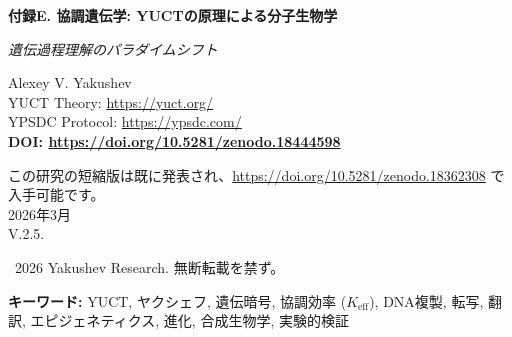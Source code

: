 \documentclass[12pt]{article}
\begin{document}
	
	\begin{titlepage}
		\begin{center}
			\vspace*{0cm}
			
			\Huge\textbf{付録E. 協調遺伝学: YUCTの原理による分子生物学}
			
			\vspace{1cm}
			
			\small\textit{遺伝過程理解のパラダイムシフト}
			
			\vspace{1cm}
			\Large
			Alexey V. Yakushev\\
			
			YUCT Theory: \url{https://yuct.org/}\\
			YPSDC Protocol: \url{https://ypsdc.com/}\\
			
			\vspace{2cm}
			\textbf{DOI: \url{https://doi.org/10.5281/zenodo.18444598}}
			
			\vspace{1cm}
			
			\vspace{0cm}
			\large 
			この研究の短縮版は既に発表され、\url{https://doi.org/10.5281/zenodo.18362308} で入手可能です。\\
			\vspace{1cm}
			2026年3月 \\ \large V.2.5.
			
			\vspace{4cm}
			\textcopyright~2026 Yakushev Research. 無断転載を禁ず。
			
			\newpage    
			\begin{abstract}
				\noindent
				本稿は、ヤクシェフの協調原理のレンズを通して遺伝過程の根本的な再考を提示する。遺伝暗号、DNA複製、遺伝子発現、進化が、測定可能な効率 $K_{\text{eff}}$ を持つ協調過程であることを示す。新しい数学モデルを導入し、従来説明できなかった現象を予測し、プログラム可能な進化への道を開く。理論は、単純な実験室試験から複雑な遺伝子工学プロジェクトに至るまで、複数の実験領域にわたって検証可能な予測を提供する。
			\end{abstract}
			
			\vspace{0cm}
			
			\noindent
			\textbf{キーワード:} YUCT, ヤクシェフ, 遺伝暗号, 協調効率 ($K_{\text{eff}}$), DNA複製, 転写, 翻訳, エピジェネティクス, 進化, 合成生物学, 実験的検証
			
			\vspace{0.5cm}
			
		\end{center}
	\end{titlepage}
	
\end{document}
